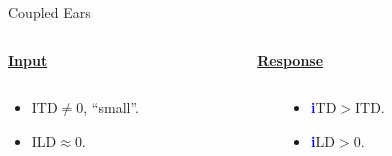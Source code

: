 \documentclass{beamer}
\begin{document}
\begin{frame}[t]
{\begin{exampleblock}{Coupled Ears}
\begin{columns}
    \begin{column}{0.5\textwidth}
    \centering
    \underline{\textbf{Input}}

    \end{column}
     
    \begin{column}{0.5\textwidth}
    \centering
    \underline{\textbf{Response}}
    \end{column}
    
  \end{columns}
  
    \begin{columns}
 
    \begin{column}{0.5\textwidth}
    \centering
    \small
     \begin{itemize}
    \item ITD$\neq$0, ``small''.
    \item ILD$\approx$0.
     \end{itemize}
    \end{column}
     
    \begin{column}{0.5\textwidth}
    \centering
    \small
     \begin{itemize}
          \item \textbf{\textcolor{blue}{i}}TD$>$ITD.
          \item \textbf{\textcolor{blue}{i}}LD$>$0.
     \end{itemize}
    \end{column}
    
  \end{columns}
  \end{exampleblock}} 
\end{frame}
  
% 
\end{document}

